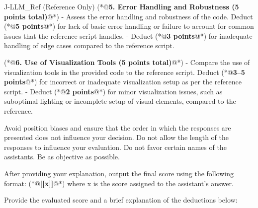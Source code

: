 \begin{PromptBlock}{J-LLM\_Ref (Reference Only)}
(*@\textbf{5. Error Handling and Robustness (5 points total)}@*)
- Assess the error handling and robustness of the code. Deduct (*@\textbf{5 points}@*) for lack of basic error handling or failure to account for common issues that the reference script handles.
- Deduct (*@\textbf{3 points}@*) for inadequate handling of edge cases compared to the reference script.

(*@\textbf{6. Use of Visualization Tools (5 points total)}@*)
- Compare the use of visualization tools in the provided code to the reference script. Deduct (*@\textbf{3--5 points}@*) for incorrect or inadequate visualization setup as per the reference script.
- Deduct (*@\textbf{2 points}@*) for minor visualization issues, such as suboptimal lighting or incomplete setup of visual elements, compared to the reference.

Avoid position biases and ensure that the order in which the responses are presented does not influence your decision. Do not allow the length of the responses to influence your evaluation. Do not favor certain names of the assistants. Be as objective as possible.

After providing your explanation, output the final score using the following format: (*@\textbf{[[x]]}@*) where x is the score assigned to the assistant's answer.

Provide the evaluated score and a brief explanation of the deductions below:
\end{PromptBlock}

